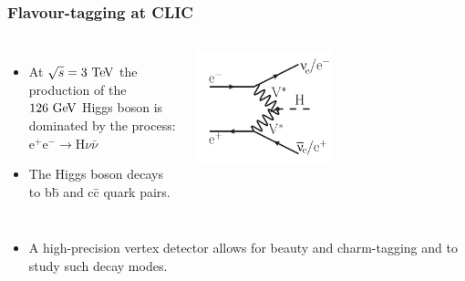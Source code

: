 \begin{frame}
  \frametitle{Flavour-tagging at CLIC}

  \begin{columns}
    \begin{itemize}
    \item At $\sqrt{s}=3\,\mathrm{\,Te\kern -0.1em V}$ the production of the $126\,\mathrm{\,Ge\kern -0.1em V}$
      Higgs
      boson is dominated by the process: \\
      e$^+$e$^- \rightarrow$H$\nu\bar{\nu}$
    \item The Higgs boson decays to b\={b} and c\={c} quark pairs.
    \end{itemize}

    \centering
    \includegraphics[width=0.5\textwidth]{figures/feynman_higgs.png}
  \end{columns}

  \begin{itemize}
  \item A high-precision vertex detector allows for beauty and
    charm-tagging and to study such decay modes.
  \end{itemize}


\end{frame}
